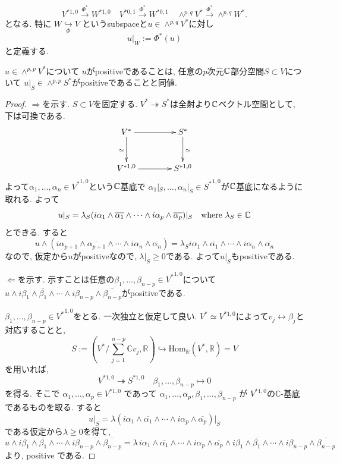 \[
V^{*1,0}\overset{\Phi^{*}}{\longrightarrow}W^{*1,0}
\quad
V^{*0,1}\overset{\Phi^{*}}{\longrightarrow} W^{*0,1}
\quad
\wedge^{p,q}V^*\overset{\Phi^{*}}{\longrightarrow}\wedge^{p,q}W^*.
\]
となる. 
特に
\(
W\underset{\Phi}{\hookrightarrow} V
\)
というsubspaceと$u \in \wedge^{p,q}V^*$に対し
\[
u|_W:=\Phi^*(u)
\]
と定義する. 

\begin{tcolorbox}[mybox]
\begin{lem}
\label{lem-M-5.4.3}
$u \in \wedge^{p, p}V^{*}$について
$u$がpositiveであることは, 任意の$p$次元$\mathbb{C}$部分空間$S \subset V$について
$u|_{S} \in \wedge^{p, p}S^{*}$がpositiveであることと同値. 
\end{lem}
\end{tcolorbox}
\begin{proof}

$\Rightarrow $を示す. $S \subset V$を固定する. 
$V^{*} \twoheadrightarrow S^{*}$は全射より$\mathbb{C}$ベクトル空間として, 下は可換である.
\[
\xymatrix@C=4em@R=3em{
V^* \ar[r] \ar[d]_{\simeq} & S^* \ar[d]^{\simeq}\\
V^{*1,0} \ar[r] & S^{*1,0}
}
\]
よって$\alpha_1, \ldots, \alpha_n \in {V^{*}}^{1, 0}$という$\mathbb{C}$基底で
$\alpha_1|_{S}, \ldots, \alpha_n|_{S} \in {S^{*}}^{1, 0}$が$\mathbb{C}$基底になるように取れる.
よって
$$
u|_{S} = \lambda_{S} (i\alpha_1\wedge\overline{\alpha_1}\wedge\cdots\wedge
i\alpha_p\wedge\overline{\alpha_p})|_{S}
\quad \text{where $\lambda_S \in \mathbb{C}$} 
$$
とできる. すると
$$
u  \wedge (i\alpha_{p+1}\wedge\overline{\alpha_{p+1}}\wedge\cdots\wedge
i\alpha_{n}\wedge\overline{\alpha_n})
=
\lambda_{S} i\alpha_1\wedge\overline{\alpha_1}\wedge\cdots\wedge
i\alpha_n\wedge\overline{\alpha_n}
$$
なので, 仮定から$u$がpositiveなので, $\lambda|_{S}\ge 0$である. 
よって$u|_{S}$もpositiveである. 

$\Leftarrow $を示す. 示すことは任意の$\beta_1, \ldots, \beta_{n-p} \in {V^{*}}^{1, 0}$について
$u \wedge i\beta_1\wedge\overline{\beta_1}\wedge\cdots\wedge
i\beta_{n-p}\wedge\overline{\beta_{n-p}}$がpositiveである.

$\beta_1, \ldots, \beta_{n-p} \in {V^{*}}^{1, 0}$をとる. 一次独立と仮定して良い. 
$V^* \simeq V^{*1,0}$によって$v_j \leftrightarrow \beta_j$と対応することと, 
$$
S:=\left(
V^*/\sum_{j=1}^{\,n-p}\mathbb C v_j,\mathbb R
\right)
\hookrightarrow 
\mathrm{Hom}_{\mathbb R}(V^*,\mathbb R)=V
$$
を用いれば, 
\[
V^{*1,0}\twoheadrightarrow S^{*1,0}
\quad
\beta_1,\ldots,\beta_{n-p}\longmapsto 0
\]
を得る. そこで
  \(\alpha_1,\ldots,\alpha_p\in V^{*1,0}\) であって
\(\alpha_1,\ldots,\alpha_p,\beta_1,\ldots,\beta_{n-p}\) が
 \(V^{*1,0}\)の\(\mathbb{C}\)-基底であるものを取る. 
すると
\[
u|_S
=
\lambda\left(
i\alpha_1\wedge\overline{\alpha_1}\wedge\cdots\wedge
i\alpha_p\wedge\overline{\alpha_p}
\right)\bigg|_S
\]
である仮定から$\lambda\geq 0$を得て, 
\[
u\wedge i\beta_1\wedge\overline{\beta_1}\wedge\cdots\wedge
i\beta_{n-p}\wedge\overline{\beta_{n-p}}
=
\lambda\,
i\alpha_1\wedge\overline{\alpha_1}\wedge\cdots\wedge
i\alpha_p\wedge\overline{\alpha_p}\wedge
i\beta_1\wedge\overline{\beta_1}\wedge\cdots\wedge
i\beta_{n-p}\wedge\overline{\beta_{n-p}}
\]
より, positive である. 
\end{proof}




